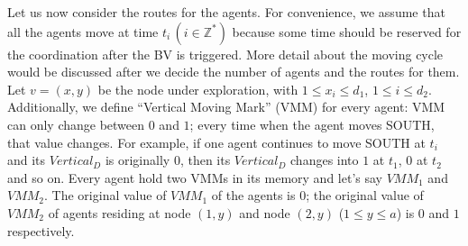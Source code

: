 Let us now consider the routes for the agents. For convenience, we assume that all the agents move at time $t_i\,(i\in\mathbb{Z}^*)$   because some time should be reserved for the coordination after the BV is triggered. More detail about the moving cycle would be discussed after we decide the number of agents and the routes for them. 
Let $v=(x, y)$ be the node under exploration, with $1\leq x_i \leq d_1$, $1\leq i \leq d_2$. Additionally, we define ``Vertical Moving Mark'' (VMM) for every agent: VMM can only change between $0$ and $1$; every time when the agent moves SOUTH, that value changes. For example, if one agent continues to move SOUTH at $t_i$  and its $Vertical_D$ is originally $0$, then its $Vertical_D$ changes into $1$ at $t_1$, $0$ at $t_2$ and so on.
Every agent hold two VMMs in its memory and let's say $VMM_1$ and $VMM_2$. The original value of $VMM_1$ of the agents is $0$; the original value of $VMM_2$ of agents residing at node $(1, y)$ and node $(2, y)$ ($1\leq y\leq a$) is $0$ and $1$ respectively. 

